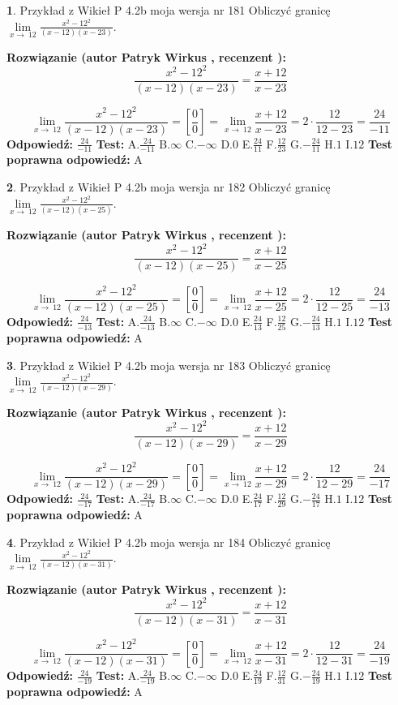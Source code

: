 \documentclass[12pt, a4paper]{article}
\theoremstyle{definition} %
\newtheorem{zad}{}
\newcommand{\zadStart}[1]{\begin{zad}#1\newline}
\newcommand{\zadStop}{\end{zad}}
\newcommand{\rozwStart}[2]{\noindent \textbf{Rozwiązanie (autor #1 , recenzent #2): }\newline}
\newcommand{\rozwStop}{\newline}
\newcommand{\odpStart}{\noindent \textbf{Odpowiedź:}\newline}
\newcommand{\odpStop}{\newline}
\newcommand{\testStart}{\noindent \textbf{Test:}\newline}
\newcommand{\testStop}{\newline}
\newcommand{\kluczStart}{\noindent \textbf{Test poprawna odpowiedź:}\newline}
\newcommand{\kluczStop}{\newline}
\begin{document}
\zadStart{Przykład z Wikieł P 4.2b moja wersja nr 181}
Obliczyć granicę $\lim\limits_{x\to\ 12}\frac{x^{2}-12^{2}}{(x-12)(x-23)}$.
\zadStop
\rozwStart{Patryk Wirkus}{}
$$\frac{x^{2}-12^{2}}{(x-12)(x-23)}=\frac{x+12}{x-23}$$

$$\lim\limits_{x\to\ 12}\frac{x^{2}-12^{2}}{(x-12)(x-23)}=[\frac{0}{0}]=\lim\limits_{x\to\ 12}\frac{x+12}{x-23}=2 \cdot \frac{12}{12-23} = \frac{24}{-11}$$
\rozwStop
\odpStart
$\frac{24}{-11}$
\odpStop
\testStart
A.$\frac{24}{-11}$
B.$\infty$
C.$-\infty$
D.$0$
E.$\frac{24}{11}$
F.$\frac{12}{23}$
G.$-\frac{24}{11}$
H.$1$
I.$12$
\testStop
\kluczStart
A
\kluczStop



\zadStart{Przykład z Wikieł P 4.2b moja wersja nr 182}
Obliczyć granicę $\lim\limits_{x\to\ 12}\frac{x^{2}-12^{2}}{(x-12)(x-25)}$.
\zadStop
\rozwStart{Patryk Wirkus}{}
$$\frac{x^{2}-12^{2}}{(x-12)(x-25)}=\frac{x+12}{x-25}$$

$$\lim\limits_{x\to\ 12}\frac{x^{2}-12^{2}}{(x-12)(x-25)}=[\frac{0}{0}]=\lim\limits_{x\to\ 12}\frac{x+12}{x-25}=2 \cdot \frac{12}{12-25} = \frac{24}{-13}$$
\rozwStop
\odpStart
$\frac{24}{-13}$
\odpStop
\testStart
A.$\frac{24}{-13}$
B.$\infty$
C.$-\infty$
D.$0$
E.$\frac{24}{13}$
F.$\frac{12}{25}$
G.$-\frac{24}{13}$
H.$1$
I.$12$
\testStop
\kluczStart
A
\kluczStop



\zadStart{Przykład z Wikieł P 4.2b moja wersja nr 183}
Obliczyć granicę $\lim\limits_{x\to\ 12}\frac{x^{2}-12^{2}}{(x-12)(x-29)}$.
\zadStop
\rozwStart{Patryk Wirkus}{}
$$\frac{x^{2}-12^{2}}{(x-12)(x-29)}=\frac{x+12}{x-29}$$

$$\lim\limits_{x\to\ 12}\frac{x^{2}-12^{2}}{(x-12)(x-29)}=[\frac{0}{0}]=\lim\limits_{x\to\ 12}\frac{x+12}{x-29}=2 \cdot \frac{12}{12-29} = \frac{24}{-17}$$
\rozwStop
\odpStart
$\frac{24}{-17}$
\odpStop
\testStart
A.$\frac{24}{-17}$
B.$\infty$
C.$-\infty$
D.$0$
E.$\frac{24}{17}$
F.$\frac{12}{29}$
G.$-\frac{24}{17}$
H.$1$
I.$12$
\testStop
\kluczStart
A
\kluczStop



\zadStart{Przykład z Wikieł P 4.2b moja wersja nr 184}
Obliczyć granicę $\lim\limits_{x\to\ 12}\frac{x^{2}-12^{2}}{(x-12)(x-31)}$.
\zadStop
\rozwStart{Patryk Wirkus}{}
$$\frac{x^{2}-12^{2}}{(x-12)(x-31)}=\frac{x+12}{x-31}$$

$$\lim\limits_{x\to\ 12}\frac{x^{2}-12^{2}}{(x-12)(x-31)}=[\frac{0}{0}]=\lim\limits_{x\to\ 12}\frac{x+12}{x-31}=2 \cdot \frac{12}{12-31} = \frac{24}{-19}$$
\rozwStop
\odpStart
$\frac{24}{-19}$
\odpStop
\testStart
A.$\frac{24}{-19}$
B.$\infty$
C.$-\infty$
D.$0$
E.$\frac{24}{19}$
F.$\frac{12}{31}$
G.$-\frac{24}{19}$
H.$1$
I.$12$
\testStop
\kluczStart
A
\kluczStop
\end{document}
